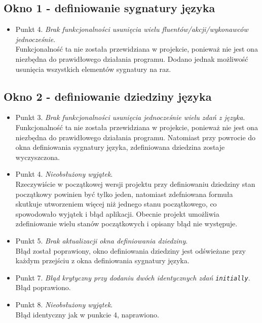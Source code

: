 \documentclass{article}
\begin{document}
\subsection{Okno 1 - definiowanie sygnatury języka}
\begin{itemize}
        \item Punkt 4. \textit{Brak funkcjonalności usunięcia wielu  fluentów/akcji/wykonawców jednocześnie}.\\
        Funkcjonalność ta nie została przewidziana w projekcie, ponieważ nie jest ona niezbędna do prawidłowego działania programu. Dodano jednak możliwość usunięcia wszystkich elementów sygnatury na raz.
    \end{itemize}
    
\subsection{Okno 2 - definiowanie dziedziny języka}
\begin{itemize}
        \item Punkt 3. \textit{Brak funkcjonalności usunięcia jednocześnie wielu zdań z języka}.\\
        Funkcjonalność ta nie została przewidziana w projekcie, ponieważ nie jest ona niezbędna do prawidłowego działania programu. Natomiast przy powrocie do okna definiowania sygnatury języka, zdefiniowana dziedzina zostaje wyczyszczona.
        \item Punkt 4. \textit{Nieobsłużony wyjątek}.\\
        Rzeczywiście w początkowej wersji projektu przy definiowaniu dziedziny stan początkowy powinien być tylko jeden, natomiast zdefniowana formuła skutkuje utworzeniem więcej niż jednego stanu początkowego, co spowodowało wyjątek i błąd aplikacji. Obecnie projekt umożliwia zdefiniowanie wielu stanów początkowych i opisany błąd nie występuje. 
        \item Punkt 5. \textit{Brak aktualizacji okna definiowania dziedziny}.\\
        Błąd został poprawiony, okno definiowania dziedziny jest odświeżane przy każdym przejściu z okna definiowania sygnatury języka.
        \item Punkt 7. \textit{Błąd krytyczny przy dodaniu dwóch identycznych zdań \texttt{initially}}.\\
        Błąd poprawiono.
        \item Punkt 8. \textit{Nieobsłużony wyjątek}.\\
        Błąd identyczny jak w punkcie 4, naprawiono.
    \end{itemize}
\end{document}
